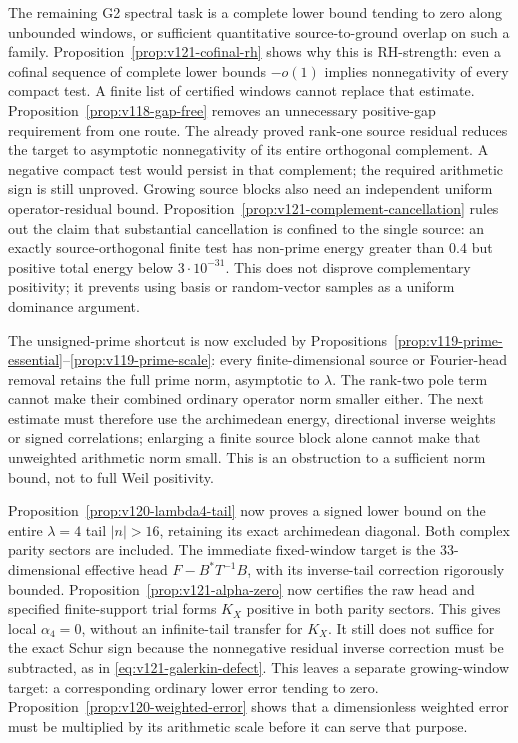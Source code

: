 \documentclass[11pt]{article}
\theoremstyle{remark}
\begin{document}
The remaining G2 spectral task is a complete lower bound tending to
zero along unbounded windows, or sufficient quantitative source-to-ground
overlap on such a family. Proposition~\ref{prop:v121-cofinal-rh}
shows why this is RH-strength: even a cofinal sequence of complete
lower bounds $-o(1)$ implies nonnegativity of every compact test.
A finite list of certified windows cannot replace that estimate.
Proposition~\ref{prop:v118-gap-free} removes an unnecessary positive-gap
requirement from one route. The already proved rank-one source residual
reduces the target to asymptotic nonnegativity of its entire orthogonal
complement. A negative compact test would persist in that complement;
the required arithmetic sign is still unproved. Growing source blocks
also need an independent uniform operator-residual bound.
Proposition~\ref{prop:v121-complement-cancellation} rules out the
claim that substantial cancellation is confined to the single source:
an exactly source-orthogonal finite test has non-prime energy greater
than $0.4$ but positive total energy below $3\cdot10^{-31}$.
This does not disprove complementary positivity; it prevents using
basis or random-vector samples as a uniform dominance argument.

The unsigned-prime shortcut is now excluded by
Propositions~\ref{prop:v119-prime-essential}--\ref{prop:v119-prime-scale}:
every finite-dimensional source or Fourier-head removal retains the
full prime norm, asymptotic to $\lambda$. The rank-two pole term cannot
make their combined ordinary operator norm smaller either. The next
estimate must therefore use the archimedean energy, directional inverse
weights or signed correlations; enlarging a finite source block alone
cannot make that unweighted arithmetic norm small. This is an
obstruction to a sufficient norm bound, not to full Weil positivity.

Proposition~\ref{prop:v120-lambda4-tail} now proves a signed lower
bound on the entire $\lambda=4$ tail $|n|>16$, retaining its exact
archimedean diagonal. Both complex parity sectors are included.
The immediate fixed-window target is the $33$-dimensional effective
head $F-B^*T^{-1}B$, with its inverse-tail correction rigorously
bounded. Proposition~\ref{prop:v121-alpha-zero} now certifies the
raw head and specified finite-support trial forms $K_X$ positive in
both parity sectors. This gives local $\alpha_4=0$, without an
infinite-tail transfer for $K_X$. It still does not suffice for the
exact Schur sign because the nonnegative residual inverse correction
must be subtracted, as in \eqref{eq:v121-galerkin-defect}.
This leaves a separate growing-window target: a corresponding ordinary
lower error tending to zero. Proposition~\ref{prop:v120-weighted-error}
shows that a dimensionless weighted error must be multiplied by its
arithmetic scale before it can serve that purpose.
\end{document}
